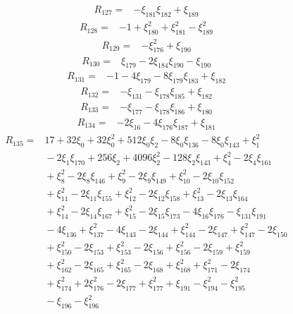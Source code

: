 \[
\begin{aligned}
 R_{127}={}&-\xi_{181}\xi_{182}+\xi_{189}
\end{aligned}
\]
\[
\begin{aligned}
 R_{128}={}&-1+\xi_{180}^{2}+\xi_{181}^{2}-\xi_{189}^{2}
\end{aligned}
\]
\[
\begin{aligned}
 R_{129}={}&-\xi_{176}^{2}+\xi_{190}
\end{aligned}
\]
\[
\begin{aligned}
 R_{130}={}&\xi_{179}-2\xi_{184}\xi_{190}-\xi_{190}
\end{aligned}
\]
\[
\begin{aligned}
 R_{131}={}&-1-4\xi_{179}-8\xi_{179}\xi_{183}+\xi_{182}
\end{aligned}
\]
\[
\begin{aligned}
 R_{132}={}&-\xi_{131}-\xi_{178}\xi_{185}+\xi_{182}
\end{aligned}
\]
\[
\begin{aligned}
 R_{133}={}&-\xi_{177}-\xi_{178}\xi_{186}+\xi_{180}
\end{aligned}
\]
\[
\begin{aligned}
 R_{134}={}&-2\xi_{16}-4\xi_{176}\xi_{187}+\xi_{181}
\end{aligned}
\]
\[
\begin{aligned}
 R_{135}={}&17+32\xi_{0}+32\xi_{0}^{2}+512\xi_{0}\xi_{2}-8\xi_{0}\xi_{136}-8\xi_{0}\xi_{143}+\xi_{1}^{2}\\
 &{}-2\xi_{1}\xi_{170}+256\xi_{2}+4096\xi_{2}^{2}-128\xi_{2}\xi_{143}+\xi_{4}^{2}-2\xi_{4}\xi_{161}\\
 &{}+\xi_{8}^{2}-2\xi_{8}\xi_{146}+\xi_{9}^{2}-2\xi_{9}\xi_{149}+\xi_{10}^{2}-2\xi_{10}\xi_{152}\\
 &{}+\xi_{11}^{2}-2\xi_{11}\xi_{155}+\xi_{12}^{2}-2\xi_{12}\xi_{158}+\xi_{13}^{2}-2\xi_{13}\xi_{164}\\
 &{}+\xi_{14}^{2}-2\xi_{14}\xi_{167}+\xi_{15}^{2}-2\xi_{15}\xi_{173}-4\xi_{16}\xi_{176}-\xi_{131}\xi_{191}\\
 &{}-4\xi_{136}+\xi_{137}^{2}-4\xi_{143}-2\xi_{144}+\xi_{144}^{2}-2\xi_{147}+\xi_{147}^{2}-2\xi_{150}\\
 &{}+\xi_{150}^{2}-2\xi_{153}+\xi_{153}^{2}-2\xi_{156}+\xi_{156}^{2}-2\xi_{159}+\xi_{159}^{2}\\
 &{}+\xi_{162}^{2}-2\xi_{165}+\xi_{165}^{2}-2\xi_{168}+\xi_{168}^{2}+\xi_{171}^{2}-2\xi_{174}\\
 &{}+\xi_{174}^{2}+2\xi_{176}^{2}-2\xi_{177}+\xi_{177}^{2}+\xi_{191}-\xi_{194}^{2}-\xi_{195}^{2}\\
 &{}-\xi_{196}-\xi_{196}^{2}
\end{aligned}
\]

